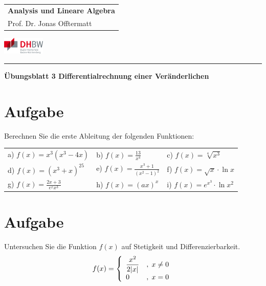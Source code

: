 \documentclass[fontsize=11pt, parskip=half]{scrartcl}
\begin{document}
\noindent
\begin{tabular}{l}
    \textbf{Analysis und Lineare Algebra} \\    
    Prof. Dr. Jonas Offtermatt
\end{tabular}
\hfill \includegraphics[width=2cm]{DHBW.pdf}\\
\rule{\textwidth}{0.5pt}


\begin{center}
    \Large
    \textbf{Übungsblatt 3 Differentialrechnung einer Veränderlichen}
\end{center}

\section{Aufgabe}

Berechnen Sie die erste Ableitung der folgenden Funktionen: \\
\begin{tabular}{lll}
a) $\displaystyle{ f(x)=x^3(x^3-4x)}$ & b) $\displaystyle{
f(x)=\frac{13}{x^4}}$ & c) $\displaystyle{ f(x)=\sqrt[4]{x^3}}$ \\
d) $\displaystyle{ f(x)=(x^3+x)^{25}}$ & e) $\displaystyle{
f(x)=\frac{x^3+1}{(x^2-1)^2}}$ & f) $\displaystyle{ f(x)=\sqrt{x}
\cdot \ln x}$ \\ g) $\displaystyle{ f(x)=\frac{2x+3}{e^x x^3}}$ & h)
$\displaystyle{ f(x)=(ax)^x}$ & i) $\displaystyle{ f(x)=e^{x^3}\cdot
\ln x^2}$
\end{tabular}



\section{Aufgabe}%
Untersuchen Sie die Funktion $f(x)$ auf Stetigkeit und
Differenzierbarkeit.
\[ f(x)=\left\{ \begin{array}{ll}
\displaystyle{\frac{x^2}{2|x|}} & ,\hspace{0.1cm} x \not= 0 \\
0 & ,\hspace{0.1cm} x=0
\end{array} \right. \]


%
%
%
\end{document}
